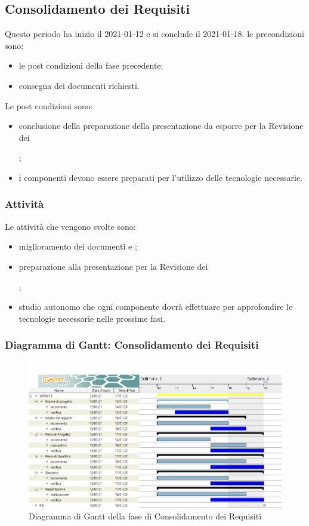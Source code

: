 \subsection{Consolidamento dei Requisiti}
Questo periodo ha inizio il 2021-01-12 e si conclude il 2021-01-18.
le precondizioni sono:
\begin{itemize}
	\item le post condizioni della fase precedente;
	\item consegna dei documenti richiesti.
\end{itemize}
Le post condizioni sono:
\begin{itemize}
	\item conclusione della preparazione della presentazione da esporre per la Revisione dei ;
	\item i componenti devono essere preparati per l'utilizzo delle tecnologie necessarie.
\end{itemize}
\subsubsection{Attività}
Le attività che vengono svolte sono:
\begin{itemize}
	\item miglioramento dei documenti e ;
	\item preparazione alla presentazione per la Revisione dei ;
	\item studio autonomo che ogni componente dovrà effettuare per approfondire le tecnologie necessarie nelle prossime fasi.
\end{itemize}
\subsubsection{Diagramma di Gantt: Consolidamento dei Requisiti}
\begin{figure}[H]
    \centering
    \includegraphics[scale = 0.4]{components/img/consolidamento_requisiti.png}
    \caption{Diagramma di Gantt della fase di Consolidamento dei Requisiti}
    \label{fig:Diagramma di Gantt, fase di Consolidamento dei Requisiti}
\end{figure}

